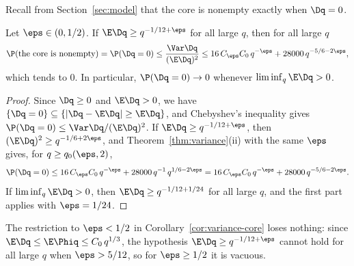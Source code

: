 Recall from Section~\ref{sec:model} that the core is nonempty exactly when $\Dq=0$.

\begin{corollary}\label{cor:variance-core}
Let $\eps\in(0,1/2)$. If $\E\Dq\ge q^{-1/12+\eps}$ for all large $q$, then for all large
$q$
\[
\P(\text{the core is nonempty})=\P(\Dq=0)\le\frac{\Var\Dq}{(\E\Dq)^2}
\le16\,C_\eps C_0\,q^{-\eps}+28000\,q^{-5/6-2\eps},
\]
which tends to $0$. In particular, $\P(\Dq=0)\to0$ whenever $\liminf_q\E\Dq>0$.
\end{corollary}

\begin{proof}
Since $\Dq\ge0$ and $\E\Dq>0$, we have $\{\Dq=0\}\subseteq\{|\Dq-\E\Dq|\ge\E\Dq\}$, and
Chebyshev's inequality gives $\P(\Dq=0)\le\Var\Dq/(\E\Dq)^2$. If
$\E\Dq\ge q^{-1/12+\eps}$, then $(\E\Dq)^2\ge q^{-1/6+2\eps}$, and
Theorem~\ref{thm:variance}(ii) with the same $\eps$ gives, for $q\ge q_0(\eps,2)$,
\[
\P(\Dq=0)\le16\,C_\eps C_0\,q^{-\eps}+28000\,q^{-1}\,q^{1/6-2\eps}
=16\,C_\eps C_0\,q^{-\eps}+28000\,q^{-5/6-2\eps}.
\]
If $\liminf_q\E\Dq>0$, then $\E\Dq\ge q^{-1/12+1/24}$ for all large $q$, and the first part
applies with $\eps=1/24$.
\end{proof}

\begin{remark}\label{rem:variance-vacuous}
The restriction to $\eps<1/2$ in Corollary~\ref{cor:variance-core} loses nothing: since
$\E\Dq\le\E\Phiq\le C_0\,q^{1/3}$, the hypothesis $\E\Dq\ge q^{-1/12+\eps}$ cannot hold for
all large $q$ when $\eps>5/12$, so for $\eps\ge1/2$ it is vacuous.
\end{remark}
